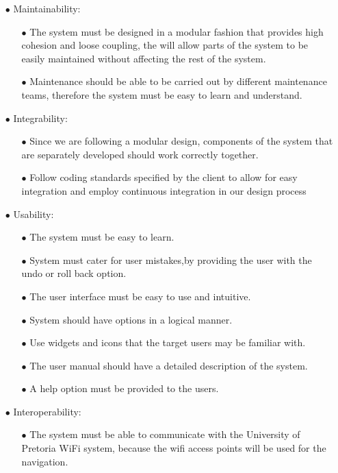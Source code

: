 \documentclass[a4paper,12pt]{article}
\begin{document}
\begin{itemize}
\item[$\bullet$] Maintainability:
	\begin{itemize}
		\item[$\bullet$] The system must be designed in a modular fashion that provides high cohesion and
		loose coupling, the will allow parts of the system to be easily maintained without affecting the rest 
		of the system.
		\item[$\bullet$] Maintenance should be able to be carried out by different maintenance teams, therefore
		the system must be easy to learn and understand.
	\end{itemize}

\item[$\bullet$] Integrability:
	\begin{itemize}
		\item[$\bullet$]Since we are following a modular design, components of the system that are
		separately developed should work  correctly together.
		\item[$\bullet$] Follow  coding standards specified by the client to allow for easy integration and employ continuous
		integration in our design process  
	\end{itemize}

\item[$\bullet$] Usability:
	\begin{itemize}
		\item[$\bullet$] The system must be easy to learn.
		\item[$\bullet$] System must cater for user mistakes,by providing the user with the undo or roll back option.
		\item[$\bullet$] The user interface must be easy to use and intuitive. 
		\item[$\bullet$] System should have options in a logical manner. 
		\item[$\bullet$] Use widgets and icons that the target users may be familiar with. 
		\item[$\bullet$] The user manual should have a detailed description of the system.
		\item[$\bullet$] A help option must be provided to the users. 
	\end{itemize}

  
\item[$\bullet$] Interoperability:
	\begin{itemize}
		\item[$\bullet$] The system must be able to communicate with the University of Pretoria WiFi system, because 
		the wifi access points will be used for the navigation.
	\end{itemize}
\end{itemize}
 
\end{document}
